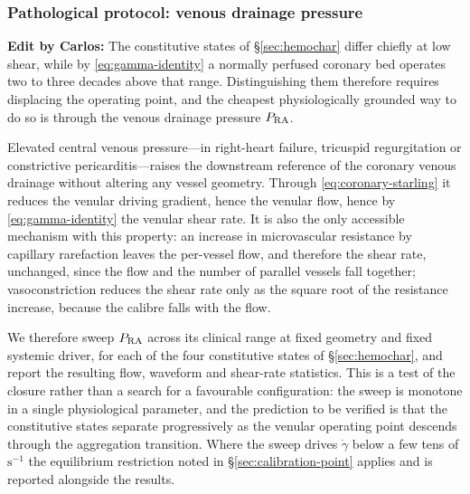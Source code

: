 \documentclass[lineno]{jfm}
\newcommand{\cbp}[1]{{\color{blue} \textbf{Edit by Carlos:} #1}}
\begin{document}
\subsubsection{Pathological protocol: venous drainage pressure}
\label{sec:pathology-protocol}

\cbp{
The constitutive states of \S\ref{sec:hemochar} differ chiefly at low shear, while
by \eqref{eq:gamma-identity} a normally perfused coronary bed operates two to
three decades above that range. Distinguishing them therefore requires displacing
the operating point, and the cheapest physiologically grounded way to do so is
through the venous drainage pressure $P_{\rm RA}$.

Elevated central venous pressure---in right-heart failure, tricuspid
regurgitation or constrictive pericarditis---raises the downstream reference of
the coronary venous drainage without altering any vessel geometry. Through
\eqref{eq:coronary-starling} it reduces the venular driving gradient, hence the
venular flow, hence by \eqref{eq:gamma-identity} the venular shear rate. It is
also the only accessible mechanism with this property: an increase in
microvascular resistance by capillary rarefaction leaves the per-vessel flow, and
therefore the shear rate, unchanged, since the flow and the number of parallel
vessels fall together; vasoconstriction reduces the shear rate only as the square
root of the resistance increase, because the calibre falls with the flow.

We therefore sweep $P_{\rm RA}$ across its clinical range at fixed geometry and
fixed systemic driver, for each of the four constitutive states of
\S\ref{sec:hemochar}, and report the resulting flow, waveform and shear-rate
statistics. This is a test of the closure rather than a search for a favourable
configuration: the sweep is monotone in a single physiological parameter, and the
prediction to be verified is that the constitutive states separate progressively
as the venular operating point descends through the aggregation transition.
Where the sweep drives $\dot{\gamma}$ below a few tens of $\mathrm{s}^{-1}$ the
equilibrium restriction noted in \S\ref{sec:calibration-point} applies and is
reported alongside the results.
}
\end{document}
